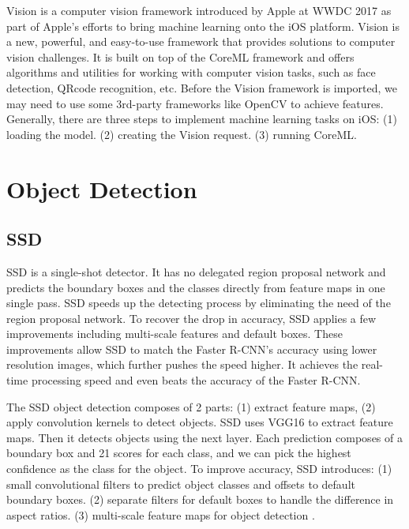 \documentclass{article}
\begin{document}
Vision is a computer vision framework introduced by Apple at WWDC 2017 as part of Apple’s efforts to bring machine learning onto the iOS platform. Vision is a new, powerful, and easy-to-use framework that provides solutions to computer vision challenges. It is built on top of the CoreML framework and offers algorithms and utilities for working with computer vision tasks, such as face detection, QRcode recognition, etc. Before the Vision framework is imported, we may need to use some 3rd-party frameworks like OpenCV to achieve features. Generally, there are three steps to implement machine learning tasks on iOS: (1) loading the model. (2) creating the Vision request. (3) running CoreML.








\section{Object Detection}

\subsection{SSD}

SSD is a single-shot detector. It has no delegated region proposal network and predicts the boundary boxes and the classes directly from feature maps in one single pass. SSD speeds up the detecting process by eliminating the need of the region proposal network. To recover the drop in accuracy, SSD applies a few improvements including multi-scale features and default boxes. These improvements allow SSD to match the Faster R-CNN’s accuracy using lower resolution images, which further pushes the speed higher. It achieves the real-time processing speed and even beats the accuracy of the Faster R-CNN. 

The SSD object detection composes of 2 parts: (1) extract feature maps, (2) apply convolution kernels to detect objects. SSD uses VGG16 to extract feature maps. Then it detects objects using the next layer. Each prediction composes of a boundary box and 21 scores for each class, and we can pick the highest confidence as the class for the object. To improve accuracy, SSD introduces: (1) small convolutional filters to predict object classes and offsets to default boundary boxes. (2) separate filters for default boxes to handle the difference in aspect ratios. (3) multi-scale feature maps for object detection \cite{liu2016ssd}.
\end{document}
